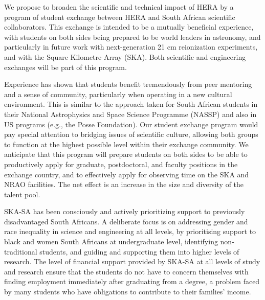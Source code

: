 \documentclass[preprint]{aastex}
\begin{document}
We propose to broaden the scientific and technical impact of HERA by a program of student exchange between HERA and South African scientific collaborators.  This exchange is intended to be a mutually beneficial experience, with students on both sides being prepared to be world leaders in astronomy, and particularly in future work with next-generation 21 cm reionization experiments, and with the Square Kilometre Array (SKA).  Both scientific and engineering exchanges will be part of this program.  

Experience has shown that students benefit tremendously from peer mentoring and a sense of community, particularly when operating in a new cultural environment.  This is similar to the approach taken for South African students in their National Astrophysics and Space Science Programme (NASSP)
and also in US programs (e.g., the Posse Foundation).
Our student exchange program would pay special attention to bridging issues of scientific culture, allowing both groups to function at the highest possible level within their exchange community.  We anticipate that this program will prepare students on both sides to be able to productively apply for graduate, postdoctoral, and faculty positions in the exchange country, and to effectively apply for observing time on the SKA and NRAO facilities.  The net effect is an increase in the size and diversity of the talent pool.

SKA-SA has been consciously and actively prioritizing support to previously disadvantaged South Africans.  A deliberate focus is on addressing gender and race inequality in science and engineering at all levels, by prioritising support to black and women South Africans at undergraduate level, identifying non-traditional students, and guiding and supporting them into higher levels of research.  The level of financial support provided by SKA-SA at all levels of study and research ensure that the students do not have to concern themselves with finding employment immediately after graduating from a degree, a problem faced by many students who have obligations to contribute to their families’ income.
\end{document}
